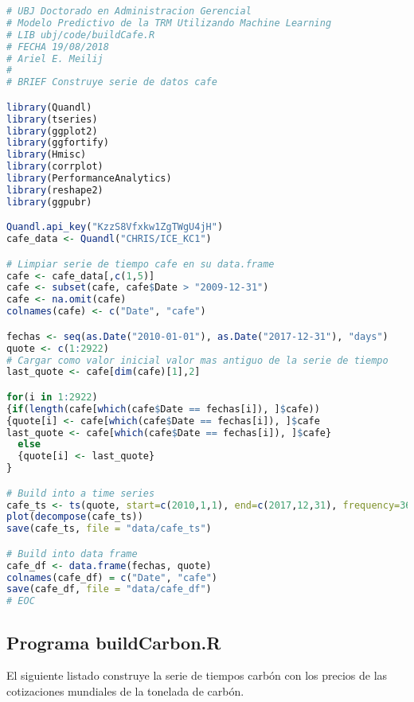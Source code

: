 \begin{lstlisting}[language=R]
# UBJ Doctorado en Administracion Gerencial
# Modelo Predictivo de la TRM Utilizando Machine Learning
# LIB ubj/code/buildCafe.R
# FECHA 19/08/2018
# Ariel E. Meilij
#
# BRIEF Construye serie de datos cafe

library(Quandl)
library(tseries)
library(ggplot2)
library(ggfortify)
library(Hmisc)
library(corrplot)
library(PerformanceAnalytics)
library(reshape2)
library(ggpubr)

Quandl.api_key("KzzS8Vfxkw1ZgTWgU4jH")
cafe_data <- Quandl("CHRIS/ICE_KC1")

# Limpiar serie de tiempo cafe en su data.frame
cafe <- cafe_data[,c(1,5)]
cafe <- subset(cafe, cafe$Date > "2009-12-31")
cafe <- na.omit(cafe)
colnames(cafe) <- c("Date", "cafe")

fechas <- seq(as.Date("2010-01-01"), as.Date("2017-12-31"), "days")
quote <- c(1:2922)
# Cargar como valor inicial valor mas antiguo de la serie de tiempo
last_quote <- cafe[dim(cafe)[1],2]

for(i in 1:2922)
{if(length(cafe[which(cafe$Date == fechas[i]), ]$cafe))
{quote[i] <- cafe[which(cafe$Date == fechas[i]), ]$cafe
last_quote <- cafe[which(cafe$Date == fechas[i]), ]$cafe}
  else
  {quote[i] <- last_quote}
}

# Build into a time series
cafe_ts <- ts(quote, start=c(2010,1,1), end=c(2017,12,31), frequency=365)
plot(decompose(cafe_ts))
save(cafe_ts, file = "data/cafe_ts")

# Build into data frame
cafe_df <- data.frame(fechas, quote)
colnames(cafe_df) = c("Date", "cafe")
save(cafe_df, file = "data/cafe_df")
# EOC
\end{lstlisting}

\subsection{Programa buildCarbon.R}
El siguiente listado construye la serie de tiempos carbón con los precios de las cotizaciones mundiales de la tonelada de carbón.

